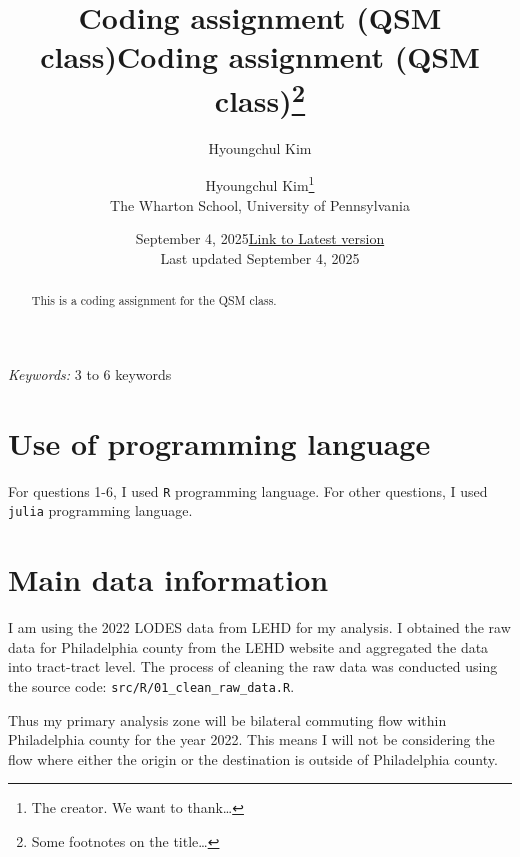 \documentclass[
  11pt]{article}
\title{Coding assignment (QSM class)}
\author{Hyoungchul Kim}
\date{September 4, 2025}
\begin{document}
\def\spacingset#1{\renewcommand{\baselinestretch}%
{#1}\small\normalsize} \spacingset{1}



\date{\href{https://hchulkim.github.io}{Link to Latest version}\\ \vspace{1em}  Last updated September
4, 2025}
\title{Coding assignment (QSM class)\thanks{Some footnotes on the
title\ldots{}}}
\author{
Hyoungchul Kim\thanks{The creator. We want to thank\ldots{}}\\
The Wharton School, University of Pennsylvania\\
}
\maketitle

\bigskip
\bigskip
\begin{abstract}
This is a coding assignment for the QSM class.
\end{abstract}

\bigskip
\noindent%
{\it Keywords:} 3 to 6 keywords
\vfill

\newpage
\spacingset{1.2} %

\section{Use of programming
language}\label{sec-use-of-programming-language}

For questions 1-6, I used \texttt{R} programming language. For other
questions, I used \texttt{julia} programming language.

\section{Main data information}\label{sec-main-data-info}

I am using the 2022 LODES data from LEHD for my analysis. I obtained the
raw data for Philadelphia county from the LEHD website and aggregated
the data into tract-tract level. The process of cleaning the raw data
was conducted using the source code:
\texttt{src/R/01\_clean\_raw\_data.R}.

Thus my primary analysis zone will be bilateral commuting flow within
Philadelphia county for the year 2022. This means I will not be
considering the flow where either the origin or the destination is
outside of Philadelphia county.
\end{document}
